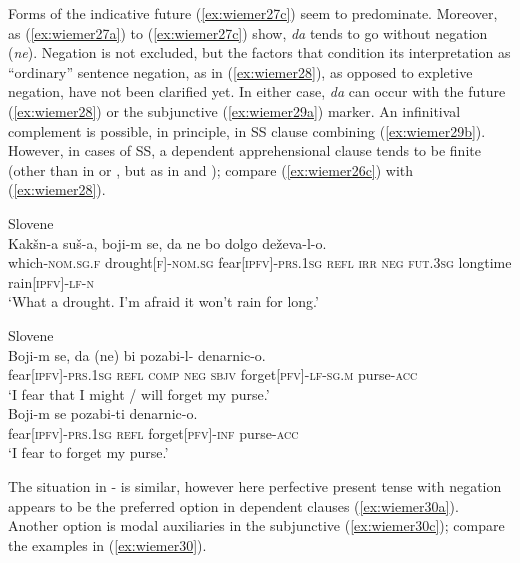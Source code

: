 \documentclass[output=paper,colorlinks,citecolor=brown]{langscibook}
\begin{document}
\noindent Forms of the indicative future (\ref{ex:wiemer27c}) seem to predominate. Moreover, as (\ref{ex:wiemer27a}) to (\ref{ex:wiemer27c}) show, \textit{da} tends to go without negation (\textit{ne}). Negation is not excluded, but the factors that condition its interpretation as ``ordinary'' sentence negation, as in (\ref{ex:wiemer28}), as opposed to expletive negation, have not been clarified yet. In either case, \textit{da} can occur with the future (\ref{ex:wiemer28}) or the subjunctive (\ref{ex:wiemer29a}) marker. An infinitival complement is possible, in principle, in SS clause combining (\ref{ex:wiemer29b}). However, in cases of SS, a dependent apprehensional clause tends to be finite (other than in  or , but as in  and ); compare (\ref{ex:wiemer26c}) with (\ref{ex:wiemer28}).


\ea 
\label{ex:wiemer28} \textnormal{Slovene} \\
\gll Kakšn-a suš-a, boji-m se, da ne bo dolgo deževa-l-o. \\
which-\textsc{nom.sg.f} drought\textsc{[f]-nom.sg} fear\textsc{[ipfv]-prs.1sg} \textsc{refl} \textsc{irr} \textsc{neg} \textsc{fut.3sg} long\textunderscore time rain\textsc{[ipfv]-lf-n} \\
\glt `What a drought. I'm afraid it won't rain for long.'
\z


\ea
\label{ex:wiemer29} \textnormal{Slovene} \\
\ea \label{ex:wiemer29a} \gll Boji-m se, da (ne) bi pozabi-l-\emptyset {} denarnic-o. \\
fear\textsc{[ipfv]-prs.1sg} \textsc{refl} \textsc{comp} \textsc{neg} \textsc{sbjv} forget\textsc{[pfv]-lf-sg.m} purse-\textsc{acc} \\
\glt `I fear that I might / will forget my purse.' \\
\ex \label{ex:wiemer29b}
\gll Boji-m se pozabi-ti denarnic-o. \\
fear\textsc{[ipfv]-prs.1sg} \textsc{refl} forget\textsc{[pfv]-inf} purse-\textsc{acc} \\
\glt `I fear to forget my purse.'
\z
\z



 The situation in - is similar, however here perfective present tense with negation appears to be the preferred option in dependent clauses (\ref{ex:wiemer30a}). Another option is modal auxiliaries in the subjunctive (\ref{ex:wiemer30c}); compare the examples in (\ref{ex:wiemer30}).
\end{document}
